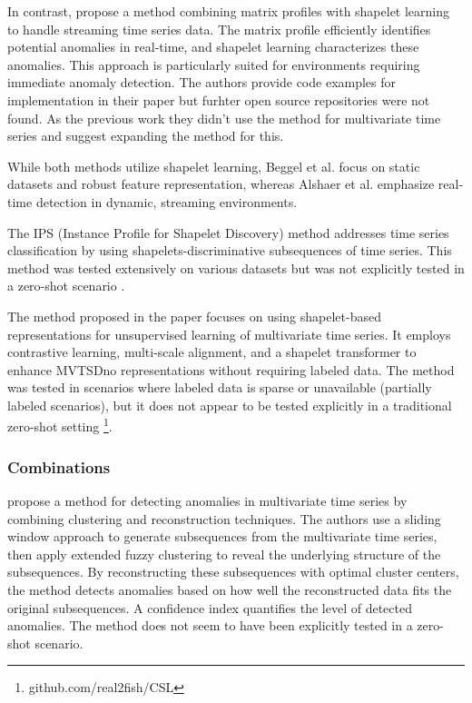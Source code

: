 In contrast, \cite{alshaer_detecting_2020} propose a method combining matrix profiles with shapelet learning to handle streaming time series data. The matrix profile efficiently identifies potential anomalies in real-time, and shapelet learning characterizes these anomalies. This approach is particularly suited for environments requiring immediate anomaly detection. The authors provide code examples for implementation in their paper but furhter open source repositories were not found. As the previous work they didn't use the method for multivariate time series and suggest expanding the method for this.

While both methods utilize shapelet learning, Beggel et al. focus on static datasets and robust feature representation, whereas Alshaer et al. emphasize real-time detection in dynamic, streaming environments.

The IPS (Instance Profile for Shapelet Discovery) method addresses time series classification by using shapelets-discriminative subsequences of time series. This method was tested extensively on various datasets but was not explicitly tested in a zero-shot scenario \cite{li_ips_2022}.

The method proposed in the paper focuses on using shapelet-based representations for unsupervised learning of multivariate time series. It employs contrastive learning, multi-scale alignment, and a shapelet transformer to enhance MVTSDno representations without requiring labeled data. The method was tested in scenarios where labeled data is sparse or unavailable (partially labeled scenarios), but it does not appear to be tested explicitly in a traditional zero-shot setting
\cite{liang_shapelet-based_2024} \footnote{\fussy\tiny github.com/real2fish/CSL}.

\subsubsection{Combinations}
\cite{li_clustering-based_2021} propose a method for detecting anomalies in multivariate time series by combining clustering and reconstruction techniques. The authors use a sliding window approach to generate subsequences from the multivariate time series, then apply extended fuzzy clustering to reveal the underlying structure of the subsequences. By reconstructing these subsequences with optimal cluster centers, the method detects anomalies based on how well the reconstructed data fits the original subsequences. A confidence index quantifies the level of detected anomalies. The method does not seem to have been explicitly tested in a zero-shot scenario.

